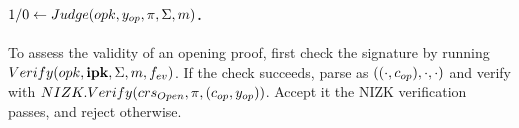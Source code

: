 \paragraph{$1/0 \gets Judge(opk,y_{op},\pi,\Sigma,m)$.} %
To assess the validity of an opening proof, first check the signature
by running $Verify(opk,\mathbf{ipk},\Sigma,m,f_{ev})$. If the check succeeds,
parse \Sig as $((\cdot,c_{op}),\cdot,\cdot)$ and verify \NIZKproof with
$NIZK.Verify(crs_{Open},\pi,(c_{op},y_{op}))$. Accept it the NIZK
verification passes, and reject otherwise.

%

